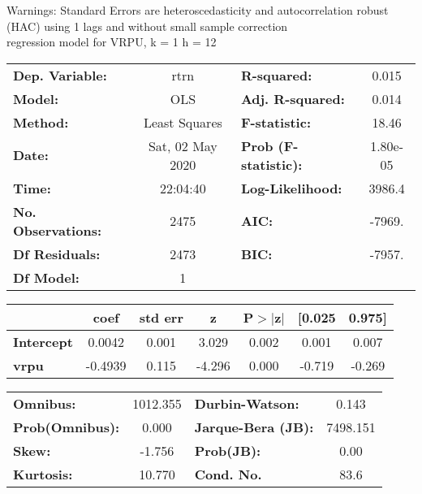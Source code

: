 Warnings: \newline
 [1] Standard Errors are heteroscedasticity and autocorrelation robust (HAC) using 1 lags and without small sample correction\\ 

regression model for VRPU, k = 1 h = 12\begin{center}
\begin{tabular}{lclc}
\toprule
\textbf{Dep. Variable:}    &       rtrn       & \textbf{  R-squared:         } &     0.015   \\
\textbf{Model:}            &       OLS        & \textbf{  Adj. R-squared:    } &     0.014   \\
\textbf{Method:}           &  Least Squares   & \textbf{  F-statistic:       } &     18.46   \\
\textbf{Date:}             & Sat, 02 May 2020 & \textbf{  Prob (F-statistic):} &  1.80e-05   \\
\textbf{Time:}             &     22:04:40     & \textbf{  Log-Likelihood:    } &    3986.4   \\
\textbf{No. Observations:} &        2475      & \textbf{  AIC:               } &    -7969.   \\
\textbf{Df Residuals:}     &        2473      & \textbf{  BIC:               } &    -7957.   \\
\textbf{Df Model:}         &           1      & \textbf{                     } &             \\
\bottomrule
\end{tabular}
\begin{tabular}{lcccccc}
                   & \textbf{coef} & \textbf{std err} & \textbf{z} & \textbf{P$> |$z$|$} & \textbf{[0.025} & \textbf{0.975]}  \\
\midrule
\textbf{Intercept} &       0.0042  &        0.001     &     3.029  &         0.002        &        0.001    &        0.007     \\
\textbf{vrpu}      &      -0.4939  &        0.115     &    -4.296  &         0.000        &       -0.719    &       -0.269     \\
\bottomrule
\end{tabular}
\begin{tabular}{lclc}
\textbf{Omnibus:}       & 1012.355 & \textbf{  Durbin-Watson:     } &    0.143  \\
\textbf{Prob(Omnibus):} &   0.000  & \textbf{  Jarque-Bera (JB):  } & 7498.151  \\
\textbf{Skew:}          &  -1.756  & \textbf{  Prob(JB):          } &     0.00  \\
\textbf{Kurtosis:}      &  10.770  & \textbf{  Cond. No.          } &     83.6  \\
\bottomrule
\end{tabular}
\end{center}

